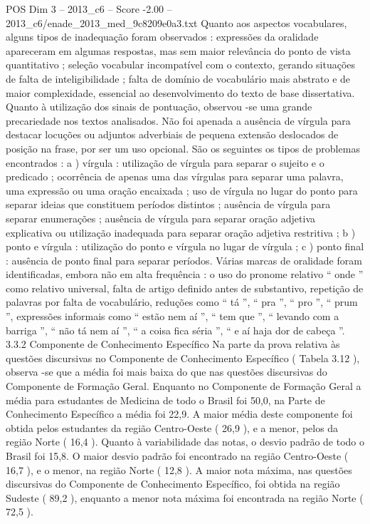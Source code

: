 \begin{textsample}{POS Dim 3 – 2013\_c6 – Score -2.00 – 2013\_c6/enade\_2013\_med\_9c8209e0a3.txt}
Quanto aos aspectos vocabulares, alguns tipos de inadequação foram observados : expressões da oralidade apareceram em algumas respostas, mas sem maior relevância do ponto de vista quantitativo ; seleção vocabular incompatível com o contexto, gerando situações de falta de inteligibilidade ; falta de domínio de vocabulário mais abstrato e de maior complexidade, essencial ao desenvolvimento do texto de base dissertativa.
Quanto à utilização dos sinais de pontuação, observou -se uma grande precariedade nos textos analisados.
Não foi apenada a ausência de vírgula para destacar locuções ou adjuntos adverbiais de pequena extensão deslocados de posição na frase, por ser um uso opcional.
São os seguintes os tipos de problemas encontrados : a ) vírgula : utilização de vírgula para separar o sujeito e o predicado ; ocorrência de apenas uma das vírgulas para separar uma palavra, uma expressão ou uma oração encaixada ; uso de vírgula no lugar do ponto para separar ideias que constituem períodos distintos ; ausência de vírgula para separar enumerações ; ausência de vírgula para separar oração adjetiva explicativa ou utilização inadequada para separar oração adjetiva restritiva ; b ) ponto e vírgula : utilização do ponto e vírgula no lugar de vírgula ; c ) ponto final : ausência de ponto final para separar períodos.
Várias marcas de oralidade foram identificadas, embora não em alta frequência : o uso do pronome relativo “ onde ” como relativo universal, falta de artigo definido antes de substantivo, repetição de palavras por falta de vocabulário, reduções como “ tá ”, “ pra ”, “ pro ”, “ prum ”, expressões informais como “ estão nem aí ”, “ tem que ”, “ levando com a barriga ”, “ não tá nem aí ”, “ a coisa fica séria ”, “ e aí haja dor de cabeça ”. 3.3.2 Componente de Conhecimento Específico Na parte da prova relativa às questões discursivas no Componente de Conhecimento Específico ( Tabela 3.12 ), observa -se que a média foi mais baixa do que nas questões discursivas do Componente de Formação Geral.
Enquanto no Componente de Formação Geral a média para estudantes de Medicina de todo o Brasil foi 50,0, na Parte de Conhecimento Específico a média foi 22,9.
A maior média deste componente foi obtida pelos estudantes da região Centro-Oeste ( 26,9 ), e a menor, pelos da região Norte ( 16,4 ).
Quanto à variabilidade das notas, o desvio padrão de todo o Brasil foi 15,8.
O maior desvio padrão foi encontrado na região Centro-Oeste ( 16,7 ), e o menor, na região Norte ( 12,8 ).
A maior nota máxima, nas questões discursivas do Componente de Conhecimento Específico, foi obtida na região Sudeste ( 89,2 ), enquanto a menor nota máxima foi encontrada na região Norte ( 72,5 ).

\end{textsample}
